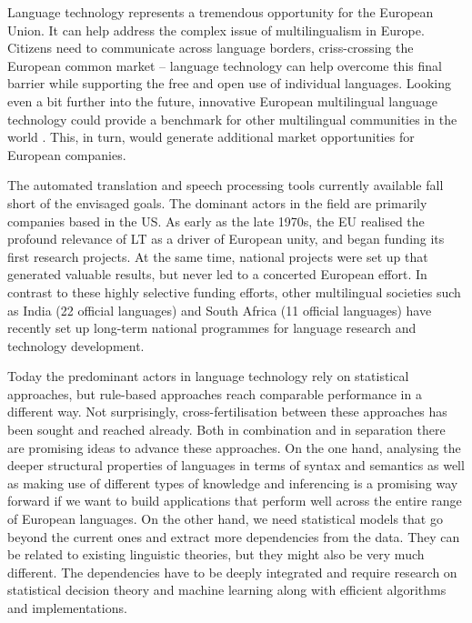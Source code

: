 \documentclass[10pt, plain]{../../metanetpaper}
\begin{document}
\begin{multicols}{2}
Language technology represents a tremendous opportunity for the European Union. It can help address the complex issue of multilingualism in Europe. Citizens need to communicate across language borders, criss-crossing the European common market -- language technology can help overcome this final barrier while supporting the free and open use of individual languages. Looking even a bit further into the future, innovative European multilingual language technology could provide a benchmark for other multilingual communities in the world \cite{maaya2012,ifa2008,ifa2011}. This, in turn, would generate additional market opportunities for European companies.

The automated translation and speech processing tools currently available fall short of the envisaged goals. The dominant actors in the field are primarily companies based in the US. As early as the late 1970s, the EU realised the profound relevance of LT as a driver of European unity, and began funding its first research projects. At the same time, national projects were set up that generated valuable results, but never led to a concerted European effort. In contrast to these highly selective funding efforts, other multilingual societies such as India (22 official languages) and South Africa (11 official languages) have recently set up long-term national programmes for language research and technology development.

Today the predominant actors in language technology rely on statistical approaches, but rule-based approaches reach comparable performance in a different way. Not surprisingly, cross-fertilisation between these approaches has been sought and reached already. Both in combination and in separation there are promising ideas to advance these approaches. On the one hand, analysing the deeper structural properties of languages in terms of syntax and semantics as well as making use of different types of knowledge and inferencing is a promising way forward if we want to build applications that perform well across the entire range of European languages. On the other hand, we need statistical models that go beyond the current ones and extract more dependencies from the data. They can be related to existing linguistic theories, but they might also be very much different. The dependencies have to be deeply integrated and require research on statistical decision theory and machine learning along with efficient algorithms and implementations.


\end{multicols}
\end{document}
